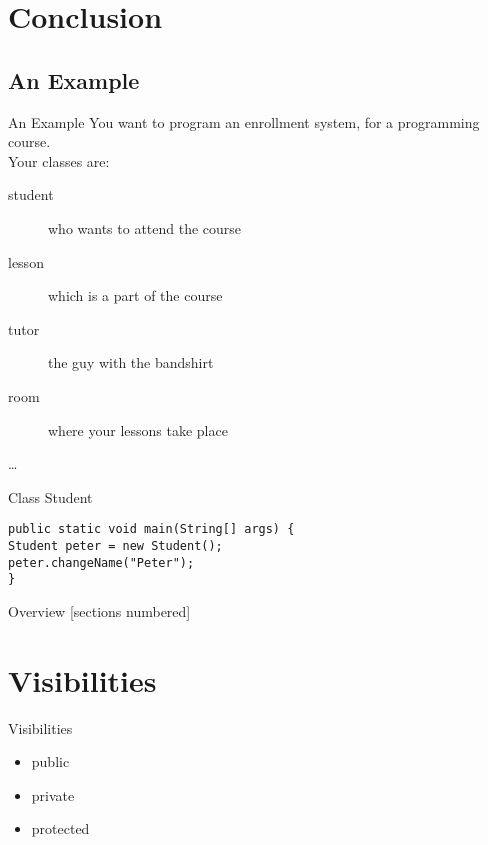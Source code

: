 \section{Conclusion}
\subsection{An Example}

\begin{frame}{An Example}
You want to program an enrollment system, for a programming course. \\
\vspace{1em}
Your classes are:\\
\begin{description}
	\item[student] who wants to attend the course
	\item[lesson] which is a part of the course
	\item[tutor] the guy with the bandshirt
	\item[room] where your lessons take place
	\item[\dots]
\end{description}
\end{frame}


\begin{frame}[fragile]{Class Student}
\begin{lstlisting}
public static void main(String[] args) {
Student peter = new Student();
peter.changeName("Peter");
}
\end{lstlisting}
\end{frame}

\begin{frame}
	\titlepage
\end{frame}
\begin{frame}{Overview}
	[sections numbered]
	\tableofcontents
\end{frame}

\section{Visibilities}
\begin{frame}[fragile]{Visibilities}
	\begin{itemize}
		\item public
		\item private
		\item protected
	\end{itemize}
\end{frame}
	
